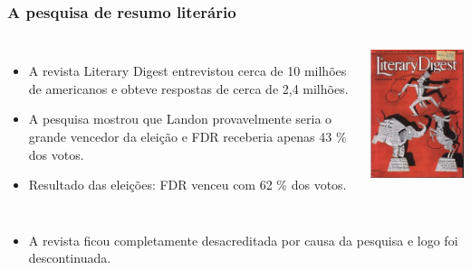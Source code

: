 \begin{frame}
\frametitle{A pesquisa de resumo literário}

\begin{columns}


\begin{itemize}
\justifying
\item A revista Literary Digest entrevistou cerca de 10 milhões de americanos e obteve respostas de cerca de 2,4 milhões.
\justifying
\item A pesquisa mostrou que Landon provavelmente seria o grande vencedor da eleição e FDR receberia apenas 43 \% dos votos.

\item Resultado das eleições: FDR venceu com 62 \% dos votos.

\end{itemize}


\includegraphics[width= \textwidth]{1-3_data_collection_principles/figures/literaryDigest.png}

\end{columns}

\begin{itemize}
\justifying
\item A revista ficou completamente desacreditada por causa da pesquisa e logo foi descontinuada.

\end{itemize}

\end{frame}

